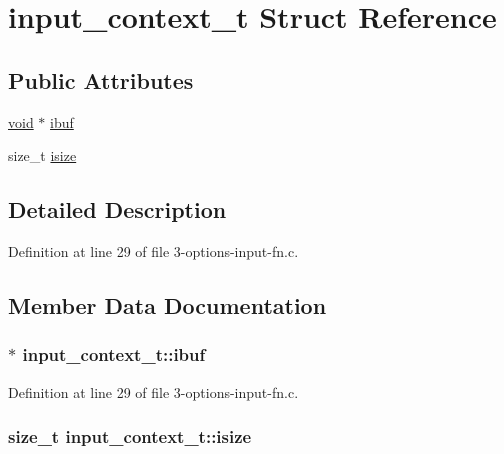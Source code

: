 \hypertarget{structinput__context__t}{}\section{input\+\_\+context\+\_\+t Struct Reference}
\label{structinput__context__t}
\subsection*{Public Attributes}
\begin{DoxyCompactItemize}
\item 
\hyperlink{sound_8c_ae35f5844602719cf66324f4de2a658b3}{void} $\ast$ \hyperlink{structinput__context__t_a82d344eaa1b2b0f977bfb4346139b8f0}{ibuf}
\item 
size\+\_\+t \hyperlink{structinput__context__t_a5e8a3a7a71cb8a97ff04fe622c82bd56}{isize}
\end{DoxyCompactItemize}


\subsection{Detailed Description}


Definition at line 29 of file 3-\/options-\/input-\/fn.\+c.



\subsection{Member Data Documentation}
\subsubsection[{\texorpdfstring{ibuf}{ibuf}}]{$\ast$ input\+\_\+context\+\_\+t\+::ibuf}\hypertarget{structinput__context__t_a82d344eaa1b2b0f977bfb4346139b8f0}{}\label{structinput__context__t_a82d344eaa1b2b0f977bfb4346139b8f0}


Definition at line 29 of file 3-\/options-\/input-\/fn.\+c.

\subsubsection[{\texorpdfstring{isize}{isize}}]{\setlength{\rightskip}{0pt plus 5cm}size\+\_\+t input\+\_\+context\+\_\+t\+::isize}\hypertarget{structinput__context__t_a5e8a3a7a71cb8a97ff04fe622c82bd56}{}\label{structinput__context__t_a5e8a3a7a71cb8a97ff04fe622c82bd56}


